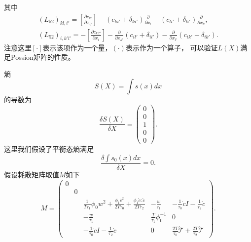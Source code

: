 	其中
	\begin{eqnarray*}
		(L_{52})_{kl,i'} = [\frac{\partial {c_{kl}}}{\partial x_{i'}}] - (c_{ki'} + \delta_{ki'}) \frac{\partial}{\partial x_l} - ( c_{li'} + \delta_{li'}) \frac{\partial}{\partial x_{k}}, \\
		(L_{52})_{i,k'l'} = -[\frac{\partial {c_{k'l'}}}{\partial x_{i}}] - \frac{\partial}{\partial x_{k'}} (c_{il'} + \delta_{il'})  - \frac{\partial}{\partial x_{l'}} ( c_{ik'} + \delta_{ik'}).
	\end{eqnarray*}
	注意这里$[\cdot]$表示该项作为一个量，$(\cdot)$表示作为一个算子，
	可以验证$L(X)$满足Possion矩阵的性质。

	熵
	\begin{equation}
		S(X) = \int s(x) dx
	\end{equation}
	的导数为
	\begin{equation*}
		\frac{\delta S(X)}{ \delta X} = \left( \begin{array}{c} 0 \\ 0 \\ 1 \\  0 \\ 0 \end{array} \right).
	\end{equation*}
	这里我们假设了平衡态熵满足
	\begin{equation}
		\frac{\delta \int s_0(x) dx}{ \delta X} = 0. 
	\end{equation}
	假设耗散矩阵取值$M$如下
	\begin{equation*}
		M = \left( \begin{array}{ccccc} 
		0 & & & & \\
		& 0 & & &  \\
		& & \frac{1}{T \tau_1} \phi_0 w^2 + \frac{\phi_1 \dot{c}^2}{2 T \tau_0} + \frac{\phi_1 \mathring{c}:\mathring{c}}{2 T \tau_2} & -\frac{w}{\tau_1} & -\frac{1}{\tau_0} \dot{c} I - \frac{1}{\tau_2} \mathring{c} \\  
		& &  -\frac{w}{\tau_1} & \frac{T}{\tau_1} \phi_0^{-1} & 0  \\
	    & &  -\frac{1}{\tau_0} \dot{c} I - \frac{1}{\tau_2} \mathring{c} & 0 & \frac{2T}{\tau_0} \dot{\mathcal{T}}   + \frac{2T}{\tau_2}  \mathring{\mathcal{T}}   
		\end{array} \right).
	\end{equation*}
